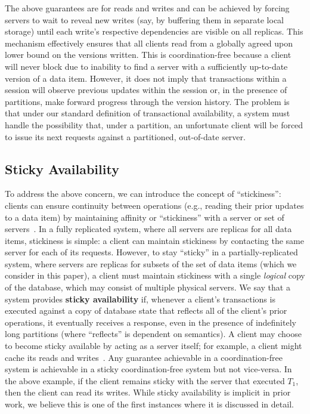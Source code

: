 The above guarantees are \iconfluent for reads and writes and can be
achieved by forcing servers to wait to reveal new writes (say, by
buffering them in separate local storage) until each write's
respective dependencies are visible on all replicas. This mechanism
effectively ensures that all clients read from a globally agreed upon
lower bound on the versions written. This is coordination-free because
a client will never block due to inability to find a server with a
sufficiently up-to-date version of a data item. However, it does not
imply that transactions within a session will observe previous updates
within the session or, in the presence of partitions, make forward
progress through the version history. The problem is that under our
standard definition of transactional availability, a system must
handle the possibility that, under a partition, an unfortunate client
will be forced to issue its next requests against a partitioned,
out-of-date server.

\subsection{Sticky Availability}

To address the above concern, we can introduce
the concept of ``stickiness'': clients can ensure continuity between
operations (e.g., reading their prior updates to a data item) by
maintaining affinity or ``stickiness'' with a server or set of
servers~\cite{vogels-defs}. In a fully replicated system, where all
servers are replicas for all data items, stickiness is simple: a
client can maintain stickiness by contacting the same server for each
of its requests. However, to stay ``sticky'' in a partially-replicated
system, where servers are replicas for subsets of the set of data
items (which we consider in this paper), a client must maintain
stickiness with a single \textit{logical} copy of the database, which
may consist of multiple physical servers. We say that a system
provides \textbf{sticky availability} if, whenever a client's
transactions is executed against a copy of database state that
reflects all of the client's prior operations, it eventually receives
a response, even in the presence of indefinitely long partitions
(where ``reflects'' is dependent on semantics). A client may choose to
become sticky available by acting as a server itself; for example, a
client might cache its reads and writes~\cite{bolton,
  sessionguarantees, swift}. Any guarantee achievable in a
coordination-free system is achievable in a sticky coordination-free
system but not vice-versa.  In the above example, if the client
remains sticky with the server that executed $T_1$, then the client
can read its writes. While sticky availability is implicit in prior
work, we believe this is one of the first instances where it is
discussed in detail.

